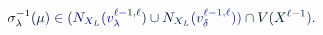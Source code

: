 \documentclass[12pt]{article}
\begin{document}
\makeatletter
\renewcommand*{\@textcolor}[3]{%
  \protect\leavevmode
  \begingroup
    \color#1{#2}#3%
  \endgroup
}
\makeatother
\begin{displaymath}
\mathcolor[RGB]{0,0,15}{\sigma} _ { \mathcolor[RGB]{0,0,30}{\lambda} } ^ { \mathcolor[RGB]{0,0,45}{-} \mathcolor[RGB]{0,0,60}{1} } \mathcolor[RGB]{0,0,75}{(} \mathcolor[RGB]{0,0,90}{\mu} \mathcolor[RGB]{0,0,105}{)} \mathcolor[RGB]{0,0,120}{\in} \mathcolor[RGB]{0,0,135}{(} \mathcolor[RGB]{0,0,150}{N} _ { \mathcolor[RGB]{0,0,165}{X} _ { \mathcolor[RGB]{0,0,180}{L} } } \mathcolor[RGB]{0,0,195}{(} \mathcolor[RGB]{0,0,210}{v} _ { \mathcolor[RGB]{0,0,225}{\lambda} } ^ { \mathcolor[RGB]{0,0,240}{\ell} \mathcolor[RGB]{0,0,255}{-} \mathcolor[RGB]{0,15,0}{1} \mathcolor[RGB]{0,15,15}{,} \mathcolor[RGB]{0,15,30}{\ell} } \mathcolor[RGB]{0,15,45}{)} \mathcolor[RGB]{0,15,60}{\cup} \mathcolor[RGB]{0,15,75}{N} _ { \mathcolor[RGB]{0,15,90}{X} _ { \mathcolor[RGB]{0,15,105}{L} } } \mathcolor[RGB]{0,15,120}{(} \mathcolor[RGB]{0,15,135}{v} _ { \mathcolor[RGB]{0,15,150}{\delta} } ^ { \mathcolor[RGB]{0,15,165}{\ell} \mathcolor[RGB]{0,15,180}{-} \mathcolor[RGB]{0,15,195}{1} \mathcolor[RGB]{0,15,210}{,} \mathcolor[RGB]{0,15,225}{\ell} } \mathcolor[RGB]{0,15,240}{)} \mathcolor[RGB]{0,15,255}{)} \mathcolor[RGB]{0,30,0}{\cap} \mathcolor[RGB]{0,30,15}{V} \mathcolor[RGB]{0,30,30}{(} \mathcolor[RGB]{0,30,45}{X} ^ { \mathcolor[RGB]{0,30,60}{\ell} \mathcolor[RGB]{0,30,75}{-} \mathcolor[RGB]{0,30,90}{1} } \mathcolor[RGB]{0,30,105}{)} \mathcolor[RGB]{0,30,120}{.}
\end{displaymath}
\end{document}
